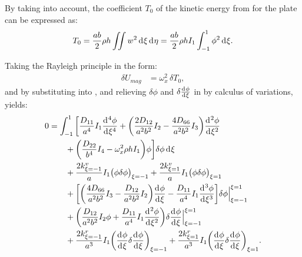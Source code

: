 \documentclass[preprint,12pt]{elsarticle}
\newcommand{\id}{\mathrm{d}\mkern1mu}
\begin{document}
%
By taking  into account, the coefficient $T_0$ of the kinetic energy from  for the plate can be expressed as:
%
\begin{equation}\label{eq:kine_energyx}
	\begin{split}
		T_0 = \frac{ab}{2}\rho h\iint w^2 \, \id \xi \, \id \eta = \frac{ab}{2}\rho h I_1\int_{-1}^{1} \phi^2 \, \id \xi.
	\end{split}
\end{equation}

Taking the Rayleigh principle in the form:
%
\begin{equation}\label{eq:Rayleighx}
	\begin{split}
		\delta U_{mag} &= \omega_x^2 \, \delta T_0,
	\end{split}
\end{equation}
%
and by substituting  into , and relieving $\delta \phi$ and $\delta\frac{\id  \phi}{\id \xi}$ in  by calculus of variations, yields:
%
\begin{equation}\label{eq:Rayleighx2}
	\begin{split}
		0 &= \int_{-1}^{1} \bigg[ \frac{D_{11}}{a^4} I_1 \frac{\id^4 \phi}{\id \xi^4} 
		+ \bigg( \frac{2D_{12}}{a^2b^2} I_2 - \frac{4D_{66}}{a^2b^2} I_3 \bigg) \frac{\id^2 \phi}{\id \xi^2} \\
		&\qquad + \bigg( \frac{D_{22}}{b^4} I_4 - \omega_x^2 \rho h I_1 \bigg) \phi \bigg] \delta \phi \, \id \xi \\
		&\qquad + \frac{2k^v_{\xi=-1}}{a} I_1 \big(\phi \delta \phi\big)_{\xi=-1} 
		+ \frac{2k^v_{\xi=1}}{a} I_1 \big(\phi \delta \phi\big)_{\xi=1} \\
		&\qquad + \bigg[ \bigg( \frac{4D_{66}}{a^2b^2} I_3 - \frac{D_{12}}{a^2b^2} I_2 \bigg) \frac{\id \phi}{\id \xi} 
		- \frac{D_{11}}{a^4} I_1 \frac{\id^3 \phi}{\id \xi^3} \bigg] \delta \phi \Big|^{\xi=1}_{\xi=-1} \\
		&\qquad + \bigg( \frac{D_{12}}{a^2b^2} I_2 \phi + \frac{D_{11}}{a^4} I_1 \frac{\id^2 \phi}{\id \xi^2} \bigg) 
		\delta\frac{\id  \phi}{\id \xi} \Big|^{\xi=1}_{\xi=-1} \\
		&\qquad + \frac{2k^r_{\xi=-1}}{a^3} I_1 \bigg(\frac{\id \phi}{\id \xi}\delta \frac{\id \phi}{\id \xi}\bigg)_{\xi=-1} 
		+ \frac{2k^r_{\xi=1}}{a^3} I_1 \bigg(\frac{\id \phi}{\id \xi} \delta\frac{\id \phi}{\id \xi}\bigg)_{\xi=1}.
	\end{split}
\end{equation}
\end{document}
